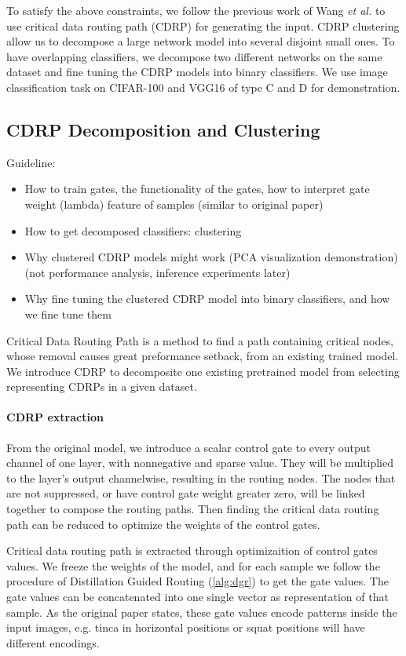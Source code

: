 \documentclass[sigplan,10pt,review]{acmart}\settopmatter{printfolios=true,printccs=false,printacmref=false}
\begin{document}
To satisfy the above constraints, we follow the previous work of Wang \textit{et al.} \cite{wang2018interpret} to use critical data routing path (CDRP) for generating the input.
CDRP clustering allow us to decompose a large network model into several disjoint small ones.
To have overlapping classifiers, we decompose two different networks on the same dataset and fine tuning the CDRP models into binary classifiers.
We use image classification task on CIFAR-100 and VGG16 of type C and D for demonstration.

\subsection{CDRP Decomposition and Clustering}
Guideline:
\begin{itemize}
	\item How to train gates, the functionality of the gates, how to interpret gate weight (lambda) feature of samples (similar to original paper)
	\item How to get decomposed classifiers: clustering
	\item Why clustered CDRP models might work (PCA visualization demonstration) (not performance analysis, inference experiments later)
	\item Why fine tuning the clustered CDRP model into binary classifiers, and how we fine tune them
\end{itemize}

Critical Data Routing Path is a method to find a path containing critical nodes, whose removal causes great preformance setback, from an existing trained model. We introduce CDRP to decomposite one existing pretrained model from selecting representing CDRPs in a given dataset.

\paragraph{CDRP extraction}

From the original model, we introduce a scalar control gate to every output channel of one layer, with nonnegative and sparse value. They will be multiplied to the layer’s output channelwise, resulting in the routing nodes. The nodes that are not suppressed, or have control gate weight greater zero, will be linked together to compose the routing paths. Then finding the critical data routing path can be reduced to optimize the weights of the control gates.

Critical data routing path is extracted through optimizaition of control gates values. We freeze the weights of the model, and for each sample we follow the procedure of Distillation Guided Routing (\cref{alg:dgr}) \cite{wang2018interpret} to get the gate values. The gate values can be concatenated into one single vector as representation of that sample. As the original paper \cite{wang2018interpret} states, these gate values encode patterns inside the input images, e.g. tinca in horizontal positions or squat positions will have different encodings.
\end{document}
